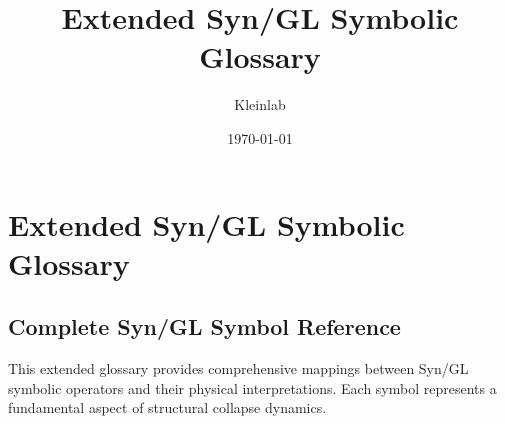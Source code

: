\documentclass[11pt]{article}
\title{Extended Syn/GL Symbolic Glossary}
\author{Kleinlab}
\date{\today}
\begin{document}
\maketitle

\section*{Extended Syn/GL Symbolic Glossary}

\subsection*{Complete Syn/GL Symbol Reference}
This extended glossary provides comprehensive mappings between Syn/GL symbolic operators and their physical interpretations. Each symbol represents a fundamental aspect of structural collapse dynamics.
\end{document}
